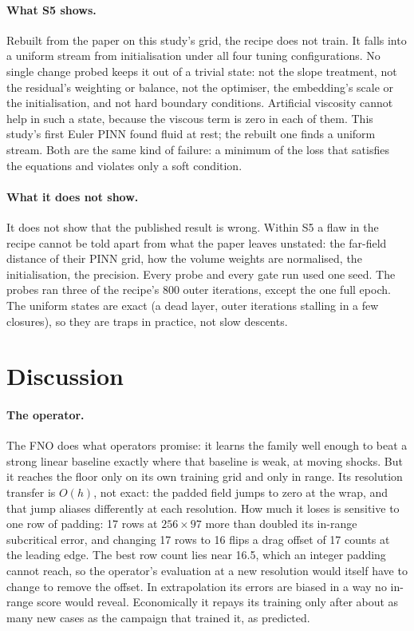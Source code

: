 \documentclass[11pt]{article}
\begin{document}
\paragraph{What S5 shows.}
Rebuilt from the paper on this study's grid, the recipe does not train. It falls into a uniform
stream from initialisation under all four tuning configurations. No single change probed keeps it
out of a trivial state: not the slope treatment, not the residual's weighting or balance, not the
optimiser, the embedding's scale or the initialisation, and not hard boundary conditions. Artificial
viscosity cannot help in such a state, because the viscous term is zero in each of them. This
study's first Euler PINN found fluid at rest; the rebuilt one finds a uniform stream. Both are the
same kind of failure: a minimum of the loss that satisfies the equations and violates only a soft
condition.

\paragraph{What it does not show.}
It does not show that the published result is wrong. Within S5 a flaw in the recipe cannot be told
apart from what the paper leaves unstated: the far-field distance of their PINN grid, how the
volume weights are normalised, the initialisation, the precision. Every probe and every gate run
used one seed. The probes ran three of the recipe's 800 outer iterations, except the one full
epoch. The uniform states are exact (a dead layer, outer iterations stalling in a few closures), so
they are traps in practice, not slow descents.

\section{Discussion}
\label{sec:discussion}

\paragraph{The operator.}
The FNO does what operators promise: it learns the family well enough to beat a strong linear
baseline exactly where that baseline is weak, at moving shocks. But it reaches the floor only on
its own training grid and only in range. Its resolution transfer is $O(h)$, not exact: the padded
field jumps to zero at the wrap, and that jump aliases differently at each resolution. How much it
loses is sensitive to one row of padding: 17 rows at $256\times97$ more than doubled its in-range
subcritical error, and changing 17 rows to 16 flips a drag offset of 17 counts at the leading
edge. The best row count lies near 16.5, which an integer padding cannot reach, so the operator's
evaluation at a new resolution would itself have to change to remove the offset. In
extrapolation its errors are biased in a way no in-range score would reveal. Economically it
repays its training only after about as many new cases as the campaign that trained it, as
predicted.
\end{document}
